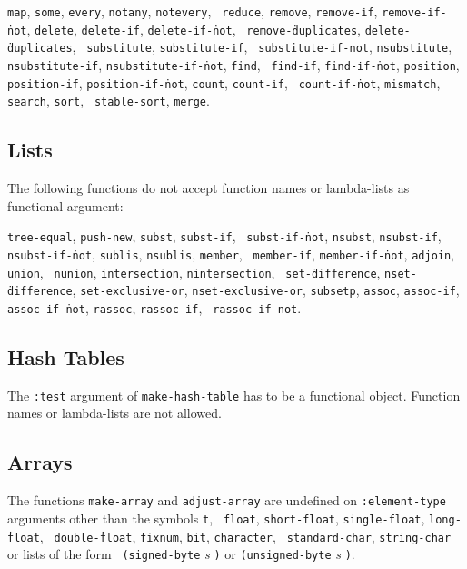 {\tt map}, {\tt some}, {\tt every}, {\tt notany}, {\tt notevery}, {\tt
reduce}, {\tt remove}, {\tt remove-\.if}, {\tt remove-\.if-\.not},
{\tt delete}, {\tt delete-\.if}, {\tt delete-\.if-\.not}, {\tt
remove-\.dup\-licates}, {\tt delete-\.dup\-licates}, {\tt
sub\-stitute}, {\tt sub\-sti\-tute-\.if}, {\tt
sub\-sti\-tute-\.if-not}, {\tt nsub\-stitute}, {\tt
nsub\-sti\-tute-if}, {\tt nsub\-stitute-\.if-\.not}, {\tt find}, {\tt
find-\.if}, {\tt find-\.if-\.not}, {\tt position}, {\tt position-if},
{\tt position-\.if-\.not}, {\tt count}, {\tt count-\.if}, {\tt
count-\.if-\.not}, {\tt mismatch}, {\tt search}, {\tt sort}, {\tt
stable-sort}, {\tt merge}.

\subsection{Lists}
\label{lists}

The following functions do not accept function names or lambda-lists as 
functional argument:

{\tt tree-equal}, {\tt push-new}, {\tt subst}, {\tt subst-\.if}, {\tt
subst-\.if-\.not}, {\tt nsubst}, {\tt nsubst-\.if}, {\tt
nsubst-\.if-\.not}, {\tt sublis}, {\tt nsublis}, {\tt member}, {\tt
member-\.if}, {\tt member-\.if-\.not}, {\tt adjoin}, {\tt union}, {\tt
nunion}, {\tt inter\-section}, {\tt ninter\-section}, {\tt
set-\.difference}, {\tt nset-\.difference}, {\tt set-exclusive-or},
{\tt nset-exclusive-or}, {\tt subsetp}, {\tt assoc}, {\tt assoc-if},
{\tt assoc-\.if-\.not}, {\tt rassoc}, {\tt rassoc-\.if}, {\tt
rassoc-\.if-not}.

\subsection{Hash Tables}

The {\tt :test} argument of {\tt make-hash-table} has to be a functional 
object. Function names or lambda-lists are not allowed.

\subsection{Arrays}
\label{arrays}

The functions {\tt make-array} and {\tt adjust-array} are undefined on
{\tt :element-type} arguments other than the symbols {\tt t}, {\tt
float}, {\tt short-float}, {\tt single-float}, {\tt long-\.float}, {\tt
double-\.float}, {\tt fixnum}, {\tt bit}, {\tt character}, {\tt
standard-char}, {\tt string-char} or lists of the form {\tt
(signed-byte} {\em s} {\tt)} or {\tt (unsigned-byte} {\em s} {\tt)}.

